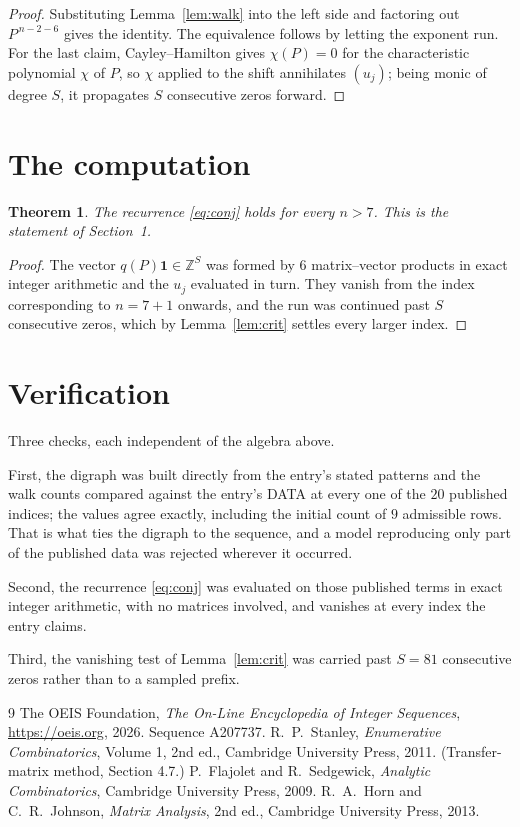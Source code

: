 \documentclass[11pt,a4paper]{article}
\theoremstyle{plain}
\newtheorem{theorem}{Theorem}
\theoremstyle{definition}
\begin{document}
\begin{proof}
Substituting Lemma~\ref{lem:walk} into the left side and factoring out
$P^{\,n-2-6}$ gives the identity. The equivalence follows by letting the exponent
run. For the last claim, Cayley--Hamilton gives $\chi(P)=0$ for the characteristic
polynomial $\chi$ of $P$, so $\chi$ applied to the shift annihilates $(u_j)$; being monic of
degree $S$, it propagates $S$ consecutive zeros forward.
\end{proof}

\section{The computation}

\begin{theorem}
The recurrence \eqref{eq:conj} holds for every $n>7$. This is the statement of
Section~1.
\end{theorem}

\begin{proof}
The vector $q(P)\mathbf{1}\in\mathbb{Z}^{S}$ was formed by $6$ matrix--vector
products in exact integer arithmetic and the $u_j$ evaluated in turn. They vanish from the
index corresponding to $n=7+1$ onwards, and the run was continued past $S$ consecutive
zeros, which by Lemma~\ref{lem:crit} settles every larger index.
\end{proof}

\section{Verification}

Three checks, each independent of the algebra above.

First, the digraph was built directly from the entry's stated patterns and the walk counts
compared against the entry's DATA at every one of the $20$ published indices; the
values agree exactly, including the initial count of $9$ admissible rows. That is
what ties the digraph to the sequence, and a model reproducing only part of the published
data was rejected wherever it occurred.

Second, the recurrence \eqref{eq:conj} was evaluated on those published terms in exact
integer arithmetic, with no matrices involved, and vanishes at every index the entry claims.

Third, the vanishing test of Lemma~\ref{lem:crit} was carried past $S=81$ consecutive
zeros rather than to a sampled prefix.

\begin{thebibliography}{9}
 The OEIS Foundation, \emph{The On-Line Encyclopedia of Integer
Sequences}, \url{https://oeis.org}, 2026. Sequence A207737.
 R.~P.~Stanley, \emph{Enumerative Combinatorics}, Volume 1, 2nd ed.,
Cambridge University Press, 2011. (Transfer-matrix method, Section 4.7.)
 P.~Flajolet and R.~Sedgewick, \emph{Analytic Combinatorics}, Cambridge
University Press, 2009.
 R.~A.~Horn and C.~R.~Johnson, \emph{Matrix Analysis}, 2nd ed., Cambridge
University Press, 2013.
\end{thebibliography}
\end{document}
